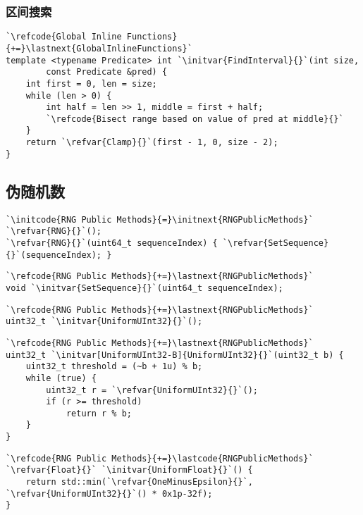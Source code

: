\subsubsection*{区间搜索}
\begin{lstlisting}
`\refcode{Global Inline Functions}{+=}\lastnext{GlobalInlineFunctions}`
template <typename Predicate> int `\initvar{FindInterval}{}`(int size,
        const Predicate &pred) {
    int first = 0, len = size;
    while (len > 0) {
        int half = len >> 1, middle = first + half;
        `\refcode{Bisect range based on value of pred at middle}{}`
    }
    return `\refvar{Clamp}{}`(first - 1, 0, size - 2);
}
\end{lstlisting}

\subsection{伪随机数}\label{sub:伪随机数}
{}
\begin{lstlisting}
`\initcode{RNG Public Methods}{=}\initnext{RNGPublicMethods}`
`\refvar{RNG}{}`();
`\refvar{RNG}{}`(uint64_t sequenceIndex) { `\refvar{SetSequence}{}`(sequenceIndex); }
\end{lstlisting}

\begin{lstlisting}
`\refcode{RNG Public Methods}{+=}\lastnext{RNGPublicMethods}`
void `\initvar{SetSequence}{}`(uint64_t sequenceIndex);
\end{lstlisting}
\begin{lstlisting}
`\refcode{RNG Public Methods}{+=}\lastnext{RNGPublicMethods}`
uint32_t `\initvar{UniformUInt32}{}`();
\end{lstlisting}
\begin{lstlisting}
`\refcode{RNG Public Methods}{+=}\lastnext{RNGPublicMethods}`
uint32_t `\initvar[UniformUInt32-B]{UniformUInt32}{}`(uint32_t b) {
    uint32_t threshold = (~b + 1u) % b;
    while (true) {
        uint32_t r = `\refvar{UniformUInt32}{}`();
        if (r >= threshold)
            return r % b;
    }
}
\end{lstlisting}

\begin{lstlisting}
`\refcode{RNG Public Methods}{+=}\lastcode{RNGPublicMethods}`
`\refvar{Float}{}` `\initvar{UniformFloat}{}`() {
    return std::min(`\refvar{OneMinusEpsilon}{}`, `\refvar{UniformUInt32}{}`() * 0x1p-32f);
}
\end{lstlisting}